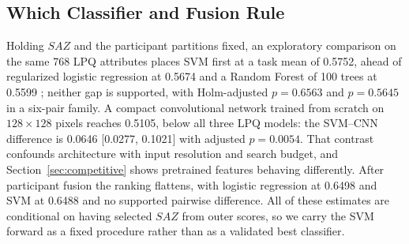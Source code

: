 \subsection{Which Classifier and Fusion Rule}
\label{sec:classifiers}
\noindent
Holding $SAZ$ and the participant partitions fixed, an exploratory comparison on the same 768 LPQ attributes places SVM first at a task mean of 0.5752, ahead of regularized logistic regression at 0.5674 and a Random Forest of 100 trees at 0.5599 \cite{Breiman2001}; neither gap is supported, with Holm-adjusted $p=0.6563$ and $p=0.5645$ in a six-pair family. A compact convolutional network trained from scratch on $128\times128$ pixels \cite{LeCun1998} reaches 0.5105, below all three LPQ models: the SVM--CNN difference is 0.0646 [0.0277, 0.1021] with adjusted $p=0.0054$. That contrast confounds architecture with input resolution and search budget, and Section~\ref{sec:competitive} shows pretrained features behaving differently. After participant fusion the ranking flattens, with logistic regression at 0.6498 and SVM at 0.6488 and no supported pairwise difference. All of these estimates are conditional on having selected $SAZ$ from outer scores, so we carry the SVM forward as a fixed procedure rather than as a validated best classifier.
